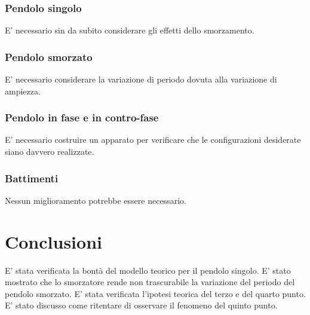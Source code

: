 \documentclass{article}
\begin{document}
\subsubsection{Pendolo singolo}
E' necessario sin da subito considerare gli effetti dello smorzamento.
\subsubsection{Pendolo smorzato}
E' necessario considerare la variazione di periodo dovuta alla variazione di ampiezza.
\subsubsection{Pendolo in fase e in contro-fase}
E' necessario costruire un apparato per verificare che le configurazioni desiderate siano davvero realizzate.
\subsubsection{Battimenti}
Nessun miglioramento potrebbe essere necessario.


\section{Conclusioni}

E' stata verificata la bontà del modello teorico per il pendolo singolo.
E' stato mostrato che lo smorzatore rende non trascurabile la variazione del periodo del pendolo smorzato.
E' stata verificata l'ipotesi teorica del terzo e del quarto punto.
E' stato discusso come ritentare di osservare il fenomeno del quinto punto.
\end{document}
